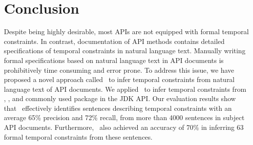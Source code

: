\section{Conclusion}
\label{sec:conclusion}

Despite being highly desirable, most APIs are not equipped with formal temporal constraints.
In contrast, documentation of API methods contains detailed specifications of temporal constraints in natural language text.
Manually writing formal specifications based on natural language text in API documents is prohibitively time consuming and error prone.
To address this issue, we have proposed a novel approach called \tool\ to infer temporal constraints from natural language text of API documents.
We applied \tool\ to infer temporal constraints from
\paypalAPI, \amazonAPI, and  
commonly used package  in the JDK API.
Our evaluation results show that \tool\ effectively identifies sentences describing
temporal constraints with an average 65\% precision and 72\% recall,
from more than 4000 sentences in subject API documents.
Furthermore, \tool\ also achieved an accuracy of
70\% in inferring 63 formal temporal constraints from these sentences.